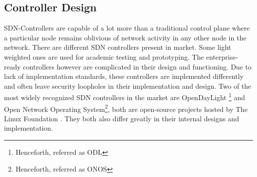 \subsection{Controller Design}
SDN-Controllers are capable of a lot more than a traditional control plane where a particular node remains oblivious of network activity in any other node in the network. There are different SDN controllers present in market. Some light weighted ones are used for academic testing and prototyping. The enterprise-ready controllers however are complicated in their design and functioning. Due to lack of implementation standards, these controllers are implemented differently and often leave security loopholes in their implementation and design. Two of the most widely recognized SDN controllers in the market are OpenDayLight \footnote{Henceforth, referred as ODL} and Open Network Operating System\footnote{Henceforth, referred as ONOS}, both are open-source projects hosted by The Linux Foundation \cite{TLF}. They both also differ greatly in their internal designs and implementation. 
